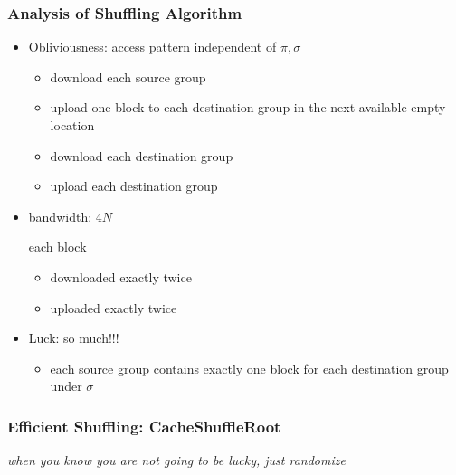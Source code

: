 \documentclass[]{beamer}
\begin{document}
{\begin{frame}
\end{frame}

\begin{frame}
\frametitle{Analysis of Shuffling Algorithm}

\begin{itemize}[<+->]

\item {\color{blue} Obliviousness}: access pattern independent of $\pi,\sigma$
    \begin{itemize}
        \item download each source group
        \item upload one block to each destination group in the next available empty location
        \item download each destination group
        \item upload each destination group
    \end{itemize}
\vskip 1cm
\item {\color{blue} bandwidth}: $4N$

        each block
    \begin{itemize}
        \item downloaded exactly twice
        \item uploaded exactly twice
    \end{itemize}

\vskip 1cm

\item {\color{blue} Luck}: so much!!!
    \begin{itemize}
        \item {\color{red} each source group} contains {\color{red} exactly one block} for 
              {\color{red} each destination group} under $\sigma$
    \end{itemize}
\end{itemize}
\end{frame}

\begin{frame}
\frametitle{Efficient Shuffling: CacheShuffleRoot}

{\em \color{brown} when you know you are not going to be lucky, just randomize}

\pause


\end{frame}}
\end{document}
